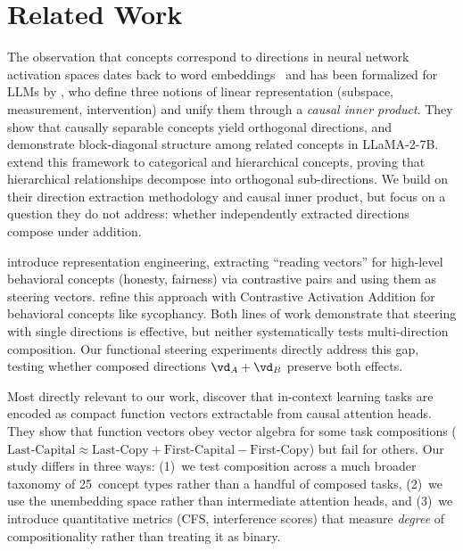 \section{Related Work}
\label{sec:related}

The observation that concepts correspond to directions in neural network activation spaces dates back to word embeddings~\citep{mikolov2013efficient} and has been formalized for LLMs by \citet{park2024linear}, who define three notions of linear representation (subspace, measurement, intervention) and unify them through a \emph{causal inner product}.
They show that causally separable concepts yield orthogonal directions, and demonstrate block-diagonal structure among related concepts in LLaMA-2-7B.
\citet{park2024geometry} extend this framework to categorical and hierarchical concepts, proving that hierarchical relationships decompose into orthogonal sub-directions.
We build on their direction extraction methodology and causal inner product, but focus on a question they do not address: whether independently extracted directions compose under addition.

\citet{zou2023representation} introduce representation engineering, extracting ``reading vectors'' for high-level behavioral concepts (honesty, fairness) via contrastive pairs and using them as steering vectors.
\citet{panickssery2023steering} refine this approach with Contrastive Activation Addition for behavioral concepts like sycophancy.
Both lines of work demonstrate that steering with single directions is effective, but neither systematically tests multi-direction composition.
Our functional steering experiments directly address this gap, testing whether composed directions $\vd_A + \vd_B$ preserve both effects.

Most directly relevant to our work, \citet{todd2024function} discover that in-context learning tasks are encoded as compact function vectors extractable from causal attention heads.
They show that function vectors obey vector algebra for some task compositions (\eg $\text{Last-Capital} \approx \text{Last-Copy} + \text{First-Capital} - \text{First-Copy}$) but fail for others.
Our study differs in three ways: (1)~we test composition across a much broader taxonomy of 25~concept types rather than a handful of composed tasks, (2)~we use the unembedding space rather than intermediate attention heads, and (3)~we introduce quantitative metrics (CFS, interference scores) that measure \emph{degree} of compositionality rather than treating it as binary.

